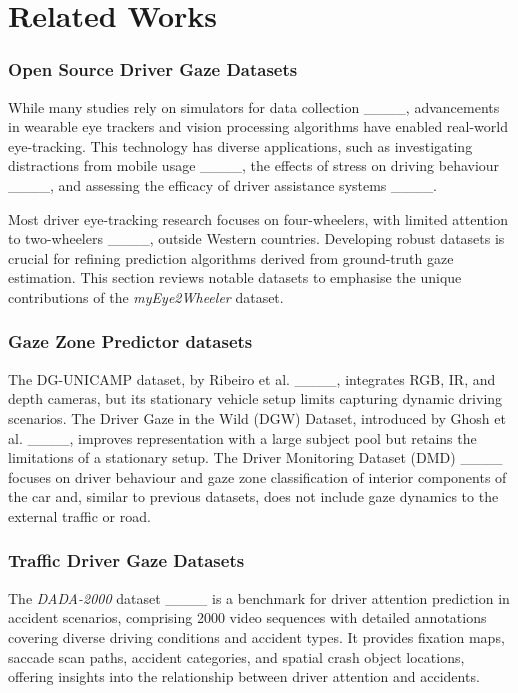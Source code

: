 \section{Related Works}
\subsubsection{Open Source Driver Gaze Datasets} 
While many studies rely on simulators for data collection ____, advancements in wearable eye trackers and vision processing algorithms have enabled real-world eye-tracking. This technology has diverse applications, such as investigating distractions from mobile usage ____, the effects of stress on driving behaviour ____, and assessing the efficacy of driver assistance systems ____.

Most driver eye-tracking research focuses on four-wheelers, with limited attention to two-wheelers ____, outside Western countries. Developing robust datasets is crucial for refining prediction algorithms derived from ground-truth gaze estimation. This section reviews notable datasets to emphasise the unique contributions of the \textit{myEye2Wheeler} dataset.
\subsubsection{Gaze Zone Predictor datasets}
The DG-UNICAMP dataset,  by Ribeiro et al. ____, integrates RGB, IR, and depth cameras, but its stationary vehicle setup limits capturing dynamic driving scenarios.
The Driver Gaze in the Wild (DGW) Dataset, introduced by Ghosh et al. ____, improves representation with a large subject pool but retains the limitations of a stationary setup.
The Driver Monitoring Dataset (DMD) ____ focuses on driver behaviour and gaze zone classification of interior components of the car and, similar to previous datasets, does not include gaze dynamics to the external traffic or road.

\subsubsection{Traffic Driver Gaze Datasets}
The \textit{DADA-2000} dataset ____ is a benchmark for driver attention prediction in accident scenarios, comprising 2000 video sequences with detailed annotations covering diverse driving conditions and accident types. It provides fixation maps, saccade scan paths, accident categories, and spatial crash object locations, offering insights into the relationship between driver attention and accidents.

